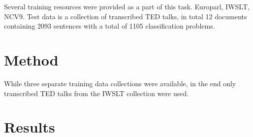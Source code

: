 \documentclass[11pt]{article}
\begin{document}
Several training resources were provided as a part of this task.
Europarl, IWSLT, NCV9.
Test data is a collection of transcribed TED talks, in total 12 documents containing 2093 sentences with a total of 1105 classification problems.


\section{Method}

While three separate training data collections were available, in the end only transcribed TED talks from the IWSLT collection were used.


\section{Results}




\end{document}
